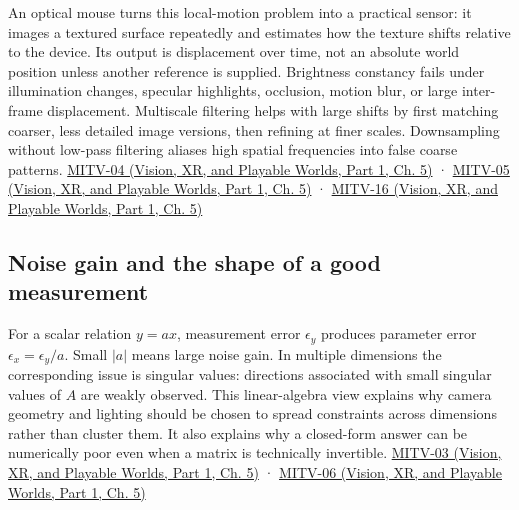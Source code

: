 An optical mouse turns this local-motion problem into a practical sensor: it images a textured surface repeatedly and estimates how the texture shifts relative to the device. Its output is displacement over time, not an absolute world position unless another reference is supplied. Brightness constancy fails under illumination changes, specular highlights, occlusion, motion blur, or large inter-frame displacement. Multiscale filtering helps with large shifts by first matching coarser, less detailed image versions, then refining at finer scales. Downsampling without low-pass filtering aliases high spatial frequencies into false coarse patterns. \href{../07-Vision-XR-and-Playable-Worlds-P01/main.pdf\#nameddest=04-visual-computing-ii-ch036-mitv-04---fixed-optical-flow-optical-mouse-constant-brightness-assumption-closed-form-solution}{MITV-04 (Vision, XR, and Playable Worlds, Part 1, Ch. 5)} · \href{../07-Vision-XR-and-Playable-Worlds-P01/main.pdf\#nameddest=04-visual-computing-ii-ch036-mitv-05---tcc-and-for-montivision-demos-vanishing-point-use-of-vps-in-camera-calibration}{MITV-05 (Vision, XR, and Playable Worlds, Part 1, Ch. 5)} · \href{../07-Vision-XR-and-Playable-Worlds-P01/main.pdf\#nameddest=04-visual-computing-ii-ch036-mitv-16---fast-convolution-low-pass-filter-approximations-integral-images-us-6457032}{MITV-16 (Vision, XR, and Playable Worlds, Part 1, Ch. 5)}

\subsection{Noise gain and the shape of a good measurement}\label{04-visual-computing-ii-ch030-noise-gain-and-the-shape-of-a-good-measurement}

\hypertarget{04-visual-computing-ii-ch030-noise-gain-and-the-shape-of-a-good-measurement}{}

For a scalar relation \(y=ax\), measurement error \(\epsilon_y\) produces parameter error \(\epsilon_x=\epsilon_y/a\). Small \(|a|\) means large noise gain. In multiple dimensions the corresponding issue is singular values: directions associated with small singular values of \(A\) are weakly observed. This linear-algebra view explains why camera geometry and lighting should be chosen to spread constraints across dimensions rather than cluster them. It also explains why a closed-form answer can be numerically poor even when a matrix is technically invertible. \href{../07-Vision-XR-and-Playable-Worlds-P01/main.pdf\#nameddest=04-visual-computing-ii-ch036-mitv-03---time-to-contact-focus-of-expansion-direct-motion-vision-methods-noise-gain}{MITV-03 (Vision, XR, and Playable Worlds, Part 1, Ch. 5)} · \href{../07-Vision-XR-and-Playable-Worlds-P01/main.pdf\#nameddest=04-visual-computing-ii-ch036-mitv-06---photometric-stereo-noise-gain-error-amplification-eigenvalues-and-eigenvectors-review}{MITV-06 (Vision, XR, and Playable Worlds, Part 1, Ch. 5)}

